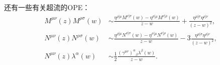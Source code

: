 还有一些有关超流的OPE：
\begin{equation}
	\begin{aligned}
		M^{\mu\nu}(z) M^{\rho\sigma}(w) 
		&\sim \frac{\eta^{\rho[\mu} M^{\nu]\sigma}(w) - \eta^{\sigma[\mu} M^{\nu]\rho}(w)}{z-w} + \frac{\eta^{\mu[\sigma} \eta^{\rho]\nu}}{(z-w)^2}, \\
		N^{\mu\nu}(z) N^{\rho\sigma}(w) 
		&\sim \frac{\eta^{\rho[\mu} N^{\nu]\sigma}(w) - \eta^{\sigma[\mu} N^{\nu]\rho}(w)}{z-w} - 3 \frac{\eta^{\mu[\sigma} \eta^{\rho]\nu}}{(z-w)^2}, \\
		N^{\mu\nu}(z) \lambda^\alpha(w) 
		&\sim \frac{1}{2} \frac{(\gamma^{\mu\nu})^\alpha{}_\beta \lambda^\beta(w)}{z-w}.
	\end{aligned}
\end{equation}